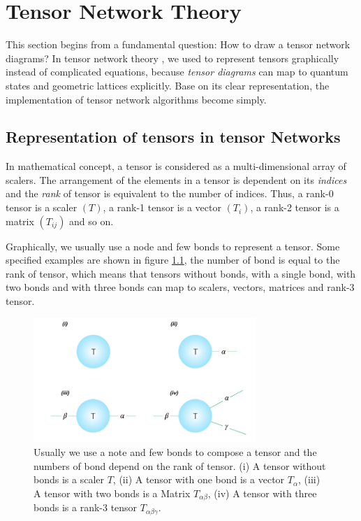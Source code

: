 \chapter{Tensor Network Theory}
This section begins from a fundamental question: How to draw a tensor network diagrams? In tensor network theory \cite{jordan_studies_2011} \cite{orus_practical_2014} \cite{bauer_tensor_2011}, we used to represent tensors graphically instead of complicated equations, because \textit{tensor diagrams} can map to quantum states and geometric lattices explicitly. Base on its clear representation, the implementation of  tensor network algorithms become simply. \section{Representation of tensors in tensor Networks}
\label{notations}
In mathematical concept, a tensor is considered as a multi-dimensional array of scalers. The arrangement of the elements in a tensor is dependent on its \textit{indices} and the \textit{rank} of tensor is equivalent to the number of indices. Thus, a rank-0 tensor is a scaler $(T)$, a rank-1 tensor is a vector $(T_{i})$, a rank-2 tensor is a matrix $(T_{ij})$ and so on. 

Graphically, we usually use a node and few bonds to represent a tensor. Some specified examples are shown in figure \ref{fig211}, the number of bond is equal to the rank of tensor, which means that tensors without bonds, with a single bond, with two bonds and with three bonds can map to scalers, vectors, matrices and rank-3 tensor.

\begin{figure}[ht]
	\centering
	\includegraphics[width=0.75\textwidth]{figures/fig211.png}
	\caption[The reprecentation of commen tensors.]{Usually we use a note and few bonds to compose a tensor and the numbers of bond depend on the rank of tensor. (i) A tensor without bonds is a scaler $T$, (ii) A tensor with one bond is a vector $T_{\alpha}$, (iii) A tensor with two bonds is a Matrix $T_{\alpha \beta}$, (iv) A tensor with three bonds is a rank-3 tensor $T_{\alpha \beta \gamma}$.}
	\label{fig211}
\end{figure}

